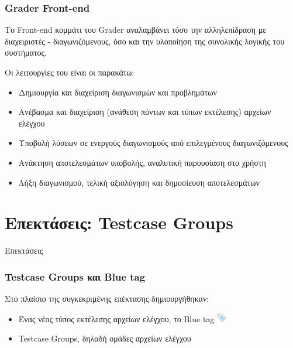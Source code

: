 \documentclass{beamer}
\begin{document}

\begin{frame}
  \frametitle{Grader Front-end}

  Το Front-end κομμάτι του Grader αναλαμβάνει τόσο την αλληλεπίδραση με
  διαχειριστές - διαγωνιζόμενους, όσο και την υλοποίηση της συνολικής λογικής
  του συστήματος.

  \bigskip

  Οι λειτουργίες του είναι οι παρακάτω:
  \begin{itemize}
      \item Δημιουργία και διαχείριση διαγωνισμών και προβλημάτων
      \item Ανέβασμα και διαχείριση (ανάθεση πόντων και τύπων εκτέλεσης) αρχείων ελέγχου
      \item Υποβολή λύσεων σε ενεργούς διαγωνισμούς από επιλεγμένους διαγωνιζόμενους
      \item Ανάκτηση αποτελεσμάτων υποβολής, αναλυτική παρουσίαση στο χρήστη
      \item Λήξη διαγωνισμού, τελική αξιολόγηση και δημοσίευση αποτελεσμάτων
  \end{itemize}
\end{frame}

\section{Επεκτάσεις: Testcase Groups}

\begin{frame}
\Huge{\centerline{Επεκτάσεις}}
\end{frame}

\begin{frame}
  \frametitle{Testcase Groups και Blue tag}
  Στο πλαίσιο της συγκεκριμένης επέκτασης δημιουργήθηκαν:
  \begin{itemize}
      \item Ένας νέος τύπος εκτέλεσης αρχείων ελέγχου, το Blue tag \includegraphics[scale=0.8]{../Figures/tag_blue.png}
      \item Testcase Groups, δηλαδή ομάδες αρχείων ελέγχου
  \end{itemize}
\end{frame}
\end{document}
